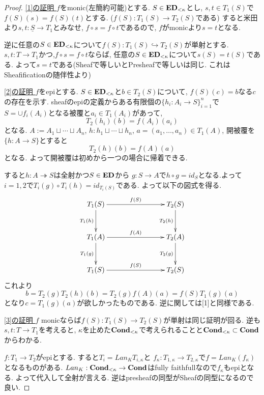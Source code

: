 \documentclass[dvipdfmx,a4paper,11pt]{article}
\theoremstyle{definition}
\begin{document}
 \begin{proof}
 
 \underline{[1]の証明 }
 $f$をmonic(左簡約可能)とする.
$S \in {\bf ED}_{<\kappa}$とし,
$s,t \in T_1(S)$で$f(S)(s)= f(S)(t)$とする. ($f(S) : T_1(S) \to T_2(S)$である)
すると米田より$s,t : \underline{S} \to T_1$とみなせ, $f \circ s = f \circ t$であるので, $f$がmonicより$s=t$となる.

逆に任意の$S \in {\bf ED}_{<\kappa}$について$f(S) : T_1(S) \hookrightarrow T_2(S)$が単射とする.
$s,t : T \to T_1$かつ,$f \circ s = f \circ t$ならば, 任意の$S \in {\bf ED}_{<\kappa}$について$s(S) = t(S)$である. よって$s=t$である(Sheafで等しいとPresheafで等しいは同じ.  これはSheafificationの随伴性より)

 \underline{[2]の証明 }
$f$をepiとする. 
$S \in {\bf ED}_{<\kappa}$と$b \in T_2(S)$について,
$f(S)(c)=b$なる$c$の存在を示す. 
sheafのepiの定義からある有限個の$\{h_i : A_i \to S \}_{i=1}^{n}$で$S=\cup f_i(A_i)$となる被覆と$a_i \in T_1(A_i)$があって, 
$$
T_2(h_i)(b) = f(A_i)(a_i)
$$
となる.
$A:= A_1 \sqcup \cdots \sqcup A_n$, $h : h_1 \sqcup \cdots \sqcup h_n$, $a=(a_1, \ldots, a_n)\in T_{1}(A)$, 
開被覆を$\{ h: A \to S \}$とすると
$$
T_2(h)(b)=f(A)(a) 
$$
となる. よって開被覆は初めから一つの場合に帰着できる.
 
 すると$h : A \twoheadrightarrow S$は全射かつ$S \in { \bf ED}$から
 $g : S \to A$で$h \circ g = id_{S}$となる.よって$i=1,2$で$T_i(g) \circ T_i(h) = id_{T_i(S)}$である.
 よって以下の図式を得る.
 \begin{equation*}
 \xymatrix@C=80pt@R=30pt{
T_1(S)\ar@{->}[r]^{f(S)}
\ar@{->}[d]_{T_1(h)}
&T_2(S)\ar@{->}[d]_{T_2(h)}
 \\   
T_1(A) \ar@{->}[r]^{f(A)}
\ar@{->}[d]_{T_1(g)}
&T_2(A)\ar@{->}[d]_{T_2(g)}
\\
T_1(S)\ar@{->}[r]^{f(S)}
&T_2(S)
 \\   
}
\end{equation*}
これより
$$
b=  T_2(g)T_2(h)(b)
=T_2(g)f(A)(a)
 =f(S)T_1(g)(a)
$$
となり$ c = T_1(g)(a)$が欲しかったものである.
逆に関しては[1]と同様である.

 \underline{[3]の証明 }
$f$ monicならば$f(S) : T_1(S) \to T_2(S)$が単射は同じ証明が回る.
逆も$s,t: T\to T_1$を考えると, $\kappa$を止めた${\bf Cond}_{<\kappa}$で考えられることと${\bf Cond}_{<\kappa} \subset {\bf Cond}$からわかる. 

$f: T_1 \to T_2$がepiとする. 
すると$T_i = Lan_{K}T_{i, \kappa}$と
$f_{\kappa}: T_{1, \kappa} \to T_{2, \kappa}$で$f = Lan_{K}(f_{\kappa})$となるものがある.
$Lan_{K} : {\bf Cond}_{<\kappa} \to {\bf Cond}$はfully faithfullなので$f_{\kappa}$もepiとなる. 
よって代入して全射が言える. 
逆はpresheafの同型がSheafの同型になるので良い.


\end{proof}
\end{document}
